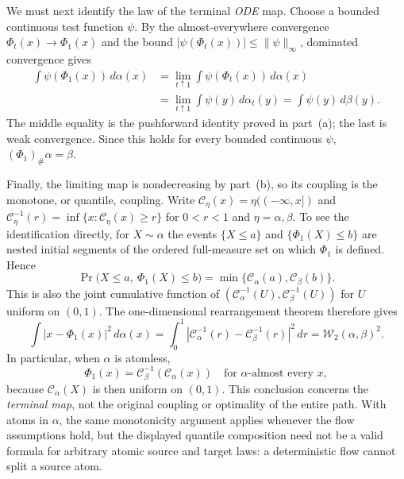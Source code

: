 \documentclass[11pt,a4paper]{article}
\theoremstyle{exostyle}
\newcommand{\push}{\#}
\newcommand{\Wtwo}{\mathcal{W}_2}
\begin{document}
\begin{solution}
We must next identify the law of the terminal \emph{ODE} map.
Choose a bounded continuous test function $\psi$. By the
almost-everywhere convergence $\Phi_t(x)\to\Phi_1(x)$ and the bound
$|\psi(\Phi_t(x))|\leq\|\psi\|_\infty$, dominated convergence gives
\begin{align*}
  \int\psi(\Phi_1(x))\,d\alpha(x)
    &=\lim_{t\uparrow1}\int\psi(\Phi_t(x))\,d\alpha(x)\\
    &=\lim_{t\uparrow1}\int\psi(y)\,d\alpha_t(y)
     =\int\psi(y)\,d\beta(y).
\end{align*}
The middle equality is the pushforward identity proved in part~(a);
the last is weak convergence. Since this holds for every bounded
continuous $\psi$, $(\Phi_1)_\push\alpha=\beta$.

Finally, the limiting map is nondecreasing by part~(b), so its coupling
is the monotone, or quantile, coupling. Write
$\mathcal C_\eta(x)=\eta(({-\infty},x])$ and
$\mathcal C_\eta^{-1}(r)=\inf\{x:\mathcal C_\eta(x)\geq r\}$ for
$0<r<1$ and $\eta=\alpha,\beta$.
To see the identification directly, for $X\sim\alpha$ the events $\{X\leq a\}$ and
$\{\Phi_1(X)\leq b\}$ are nested initial segments of the ordered
full-measure set on which $\Phi_1$ is defined. Hence
\[
  \Pr\bigl(X\leq a,\ \Phi_1(X)\leq b\bigr)
       =\min\{\mathcal C_\alpha(a),\mathcal C_\beta(b)\}.
\]
This is also the joint cumulative function of
$(\mathcal C_\alpha^{-1}(U),\mathcal C_\beta^{-1}(U))$ for
$U$ uniform on $(0,1)$. The one-dimensional rearrangement theorem
therefore gives
\[
  \int|x-\Phi_1(x)|^2\,d\alpha(x)
    =\int_0^1|\mathcal C_\alpha^{-1}(r)-\mathcal C_\beta^{-1}(r)|^2\,dr
    =\Wtwo(\alpha,\beta)^2.
\]
In particular, when $\alpha$ is atomless,
\[
  \Phi_1(x)=\mathcal C_\beta^{-1}(\mathcal C_\alpha(x))
  \quad\text{for $\alpha$-almost every $x$},
\]
because $\mathcal C_\alpha(X)$ is then uniform on $(0,1)$.
This conclusion concerns the \emph{terminal map}, not the
original coupling or optimality of the entire path. With atoms in
$\alpha$, the same monotonicity argument applies whenever the flow
assumptions hold, but the displayed quantile composition need not be
a valid formula for arbitrary atomic source and target laws: a
deterministic flow cannot split a source atom.
\end{solution}
\end{document}

